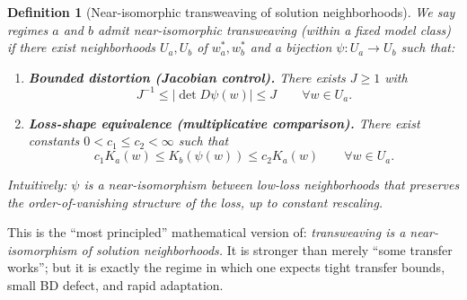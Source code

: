 \documentclass[11pt]{article}
\newtheorem{definition}{Definition}
\begin{document}
\begin{definition}[Near-isomorphic transweaving of solution neighborhoods]
\label{def:near_iso}
We say regimes $a$ and $b$ admit \emph{near-isomorphic transweaving (within a fixed model class)}
if there exist neighborhoods $U_a,U_b$ of $w_a^\ast,w_b^\ast$ and a bijection
$\psi:U_a \to U_b$ such that:
\begin{enumerate}
\item \textbf{Bounded distortion (Jacobian control).} There exists $J \ge 1$ with
\[
J^{-1} \le |\det D\psi(w)| \le J \qquad \forall w \in U_a.
\]
\item \textbf{Loss-shape equivalence (multiplicative comparison).} There exist constants
$0<c_1 \le c_2<\infty$ such that
\begin{equation}
c_1 K_a(w) \le K_b(\psi(w)) \le c_2 K_a(w) \qquad \forall w \in U_a.
\label{eq:mult_equiv}
\end{equation}
\end{enumerate}
Intuitively: $\psi$ is a near-isomorphism between low-loss neighborhoods that preserves
the order-of-vanishing structure of the loss, up to constant rescaling.
\end{definition}

This is the ``most principled'' mathematical version of: \emph{transweaving is a near-isomorphism of
solution neighborhoods.} It is stronger than merely ``some transfer works''; but it is exactly the
regime in which one expects tight transfer bounds, small BD defect, and rapid adaptation.
\end{document}
